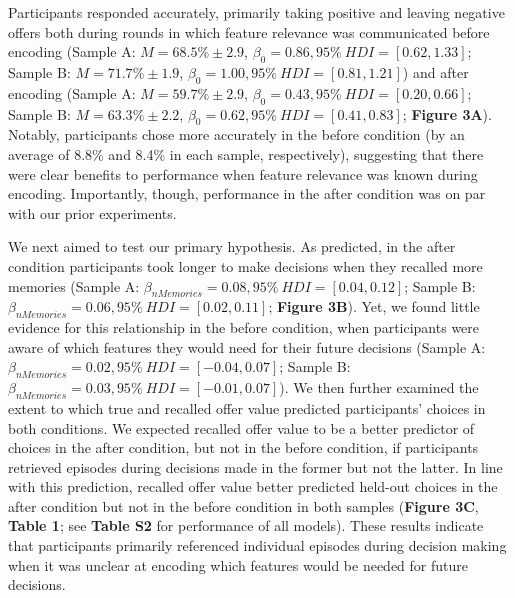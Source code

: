 \documentclass[10pt,letterpaper]{article}
\begin{document}
Participants responded accurately, primarily taking positive and leaving negative offers both during rounds in which feature relevance was communicated before encoding (Sample A: $M = 68.5\% \pm 2.9$, $\beta_{0} = 0.86, 95\% \ HDI = [0.62, 1.33]$; Sample B: $M = 71.7\% \pm 1.9$, $\beta_{0} = 1.00, 95\% \ HDI = [0.81, 1.21]$) and after encoding (Sample A: $M = 59.7\% \pm 2.9$, $\beta_{0} = 0.43, 95\% \ HDI = [0.20, 0.66]$; Sample B: $M = 63.3\% \pm 2.2$, $\beta_{0} = 0.62, 95\% \ HDI = [0.41, 0.83]$; \textbf{Figure 3A}). Notably, participants chose more accurately in the before condition (by an average of 8.8\% and 8.4\% in each sample, respectively), suggesting that there were clear benefits to performance when feature relevance was known during encoding. Importantly, though, performance in the after condition was on par with our prior experiments.  

We next aimed to test our primary hypothesis. As predicted, in the after condition participants took longer to make decisions when they recalled more memories (Sample A: $\beta_{nMemories} = 0.08, 95\% \ HDI = [0.04, 0.12]$; Sample B: $\beta_{nMemories} = 0.06, 95\% \ HDI = [0.02, 0.11]$; \textbf{Figure 3B}). Yet, we found little evidence for this relationship in the before condition, when participants were aware of which features they would need for their future decisions (Sample A: $\beta_{nMemories} = 0.02, 95\% \ HDI = [-0.04, 0.07]$; Sample B: $\beta_{nMemories} = 0.03, 95\% \ HDI = [-0.01, 0.07]$). We then further examined the extent to which true and recalled offer value predicted participants' choices in both conditions. We expected recalled offer value to be a better predictor of choices in the after condition, but not in the before condition, if participants retrieved episodes during decisions made in the former but not the latter. In line with this prediction, recalled offer value better predicted held-out choices in the after condition but not in the before condition in both samples (\textbf{Figure 3C}, \textbf{Table 1}; see \textbf{Table S2} for performance of all models). These results indicate that participants primarily referenced individual episodes during decision making when it was unclear at encoding which features would be needed for future decisions.
\end{document}
